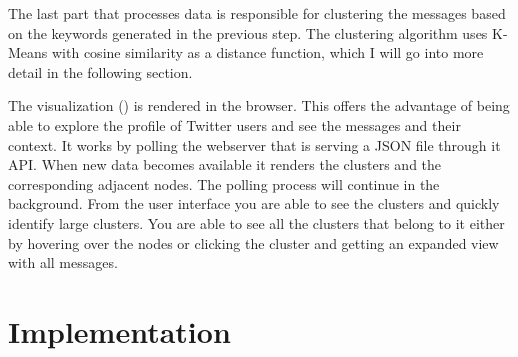 The last part that processes data is responsible for clustering the messages based on the keywords generated in the previous step. The clustering algorithm uses K-Means with cosine similarity as a distance function, which I will go into more detail in the following section.

The visualization ({\frontend})  is rendered in the browser. This offers the advantage of being able to explore the profile of Twitter users and see the messages and their context. It works by polling the webserver that is serving a JSON file through it API. When new data becomes available it renders the clusters and the corresponding adjacent nodes. The polling process will continue in the background. From the user interface you are able to see the clusters and quickly identify large clusters. You are able to see all the clusters that belong to it either by hovering over the nodes or clicking the cluster and getting an expanded view with all messages.

\section{Implementation}
\label{sec:implementation}

